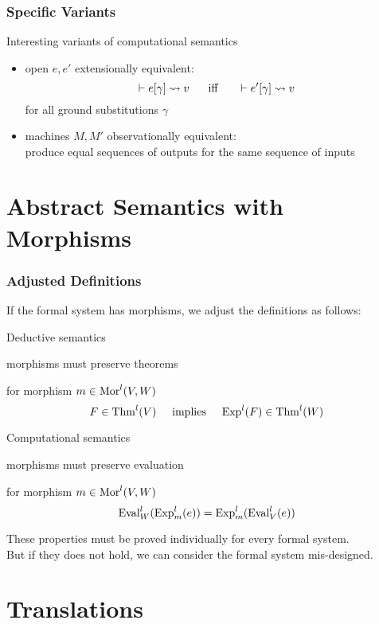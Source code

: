 \begin{frame}\frametitle{Specific Variants}
Interesting variants of computational semantics
\begin{itemize}
\item open $e,e'$ extensionally equivalent:
  \[\vdash e[\gamma]\rightsquigarrow v \hspace*{.5cm}\;\mathrm{iff}\;\hspace*{.5cm} \vdash e'[\gamma]\rightsquigarrow v\]
  for all ground substitutions $\gamma$
\item machines $M,M'$ observationally equivalent: \\
  produce equal sequences of outputs for the same sequence of inputs
\end{itemize}

\end{frame}


\section{Abstract Semantics with Morphisms}

\begin{frame}\frametitle{Adjusted Definitions}
If the formal system has morphisms, we adjust the definitions as follows:

\begin{blockitems}{Deductive semantics}
\item morphisms must preserve theorems
\item for morphism $m\in\mathrm{Mor}^l(V,W)$
   \[F\in \mathrm{Thm}^l(V)\hspace*{.5cm}\text{implies}\hspace*{.5cm} \mathrm{Exp}^l(F)\in \mathrm{Thm}^l(W)\]
\end{blockitems}

\begin{blockitems}{Computational semantics}
\item morphisms must preserve evaluation
\item for morphism $m\in\mathrm{Mor}^l(V,W)$
 \[\mathrm{Eval}^l_W(\mathrm{Exp}^l_m(e))=\mathrm{Exp}^l_m(\mathrm{Eval}^l_V(e))\]
\end{blockitems}
These properties must be proved individually for every formal system.\\
But if they does not hold, we can consider the formal system mis-designed.
\end{frame}


\section{Translations}

